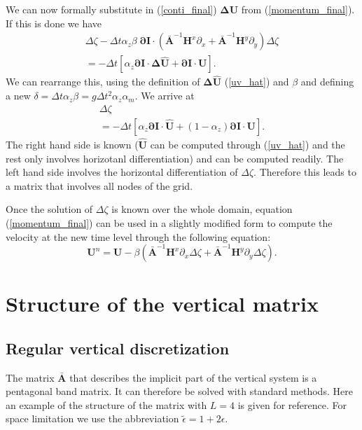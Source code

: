 \documentclass[12pt,draft]{article}
\newcommand{\zdel}{\Delta \zeta}
\newcommand{\UV}{\mathbf{U}}
\newcommand{\UVnew}{\mathbf{U}^n}
\newcommand{\UVdel}{\mathbf{\Delta U}}
\newcommand{\UVhat}{\hat{\mathbf{U}}}
\newcommand{\UVhatdel}{\mathbf{\Delta \hat{U}}}
\newcommand{\HH}{\mathbf{H}}
\newcommand{\Amat}{\mathbf{\bar{A}}}
\newcommand{\AmatI}{\mathbf{\bar{A}}^{-1}}
\newcommand{\Ipart}{\mathbf{\partial I}}
\newcommand{\dt}{\Delta t}
\newcommand{\delx}{\partial_x}
\newcommand{\dely}{\partial_y}
\begin{document}
We can now formally substitute in (\ref{conti_final})
$\UVdel$ from (\ref{momentum_final}). If this is done
we have
\begin{multline}
	\zdel
	- \dt\alpha_z\beta\; \Ipart\cdot
		(\AmatI\HH^x\delx+\AmatI\HH^y\dely)\zdel \\
	=
	- \dt[ \alpha_z\Ipart\cdot\UVhatdel
	+ \Ipart\cdot\UV ].
\end{multline}
We can rearrange this, using the definition of $\UVhatdel$ 
(\ref{uv_hat}) and
$\beta$ and 
defining a new $\delta=\dt\alpha_z\beta =
g\dt^2\alpha_z\alpha_m$. We arrive at
\begin{multline}
	[ 1
	- \delta\; \Ipart\cdot
		(\AmatI\HH^x\delx+\AmatI\HH^y\dely) ] \zdel \\
	=
	- \dt[ \alpha_z\Ipart\cdot\UVhat
	+ (1-\alpha_z)\Ipart\cdot\UV ].
\end{multline}
The right hand side is known ($\UVhat$ can be computed through
(\ref{uv_hat}) and the rest only involves horizotanl differentiation)
and can be computed readily. The left hand side involves the 
horizontal differentiation of $\zdel$. Therefore this leads to 
a matrix that involves all nodes of the grid. 

Once the solution of $\zdel$ is known over the whole domain,
equation (\ref{momentum_final}) can be used in a slightly
modified form to compute the velocity at the new time level
through the following equation:
\begin{equation}
	\label{uv_final}
	\UVnew = \UV
		- \beta 
		\left(
		\AmatI\HH^x\delx\zdel+\AmatI\HH^y\dely\zdel
		\right).
\end{equation}


\appendix



\section{Structure of the vertical matrix}

\subsection{Regular vertical discretization}

The matrix $\Amat$ that describes the implicit part of the 
vertical system is a pentagonal band matrix. It can therefore 
be solved with standard methods. Here an
example of the structure of
the matrix with $L=4$ is given for reference. 
For space limitation we use
the abbreviation $\tilde{\epsilon}=1+2\epsilon$.
\end{document}
